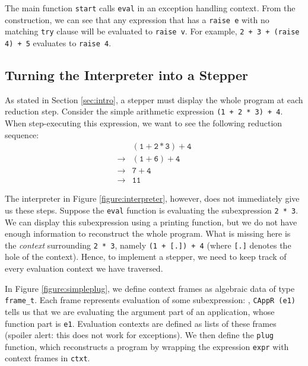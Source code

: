 The main function \texttt{start} calls \texttt{eval} in an exception handling context.  From the construction, we can see that any expression that has a \texttt{raise e} with no matching \texttt{try} clause will be evaluated to \texttt{raise v}.  For example, \texttt{2 + 3 + (raise 4) + 5} evaluates to \texttt{raise 4}.

\subsection{Turning the Interpreter into a Stepper}
\label{sec:imp:stepper}

As stated in Section \ref{sec:intro}, a stepper must display the whole program at each reduction step.  Consider the simple arithmetic expression \texttt{(1 + 2 * 3) + 4}.  When step-executing this expression, we want to see the following reduction sequence:
\[
\begin{array}{cl}
            & \mathtt{(1 + 2 * 3) + 4} \\
\rightarrow & \mathtt{(1 + 6) + 4} \\
\rightarrow & \mathtt{7 + 4} \\
\rightarrow & \mathtt{11}
\end{array}
\]

The interpreter in Figure \ref{figure:interpreter}, however, does not immediately give us these steps.  Suppose the \texttt{eval} function is evaluating the subexpression \texttt{2 * 3}.  We can display this subexpression using a printing function, but we do not have enough information to reconstruct the whole program.  What is missing here is the \emph{context} surrounding \texttt{2 * 3}, namely \texttt{(1 + [.])\ + 4} (where \texttt{[.]} denotes the hole of the context).  Hence, to implement a stepper, we need to keep track of every evaluation context we have traversed.  

In Figure \ref{figure:simpleplug}, we define context frames as algebraic data of type \texttt{frame\_t}.  Each frame represents evaluation of some subexpression: \eg, \texttt{CAppR (e1)} tells us that we are evaluating the argument part of an application, whose function part is \texttt{e1}.  Evaluation contexts are defined as lists of these frames (spoiler alert: this does not work for exceptions).  We then define the \texttt{plug} function, which reconstructs a program by wrapping the expression \texttt{expr} with context frames in \texttt{ctxt}. 

